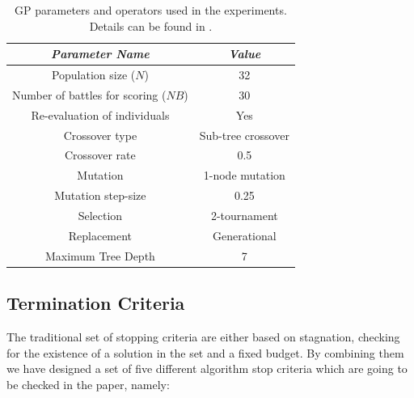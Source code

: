 \documentclass[runningheads,a4paper]{llncs}
\begin{document}
\begin{table}
\begin{center}
\begin{tabular}{|c|c|}
\hline
{\em Parameter Name} & {\em Value} \\ \hline
Population size ($N$) & 32 \\ \hline
Number of battles for scoring ($NB$) & 30 \\ \hline 
Re-evaluation of individuals & Yes \\ \hline
Crossover type & Sub-tree crossover \\ \hline
Crossover rate & 0.5\\ \hline
Mutation  & 1-node mutation\\ \hline
Mutation step-size & 0.25 \\ \hline
Selection & 2-tournament \\ \hline
Replacement & Generational\\ \hline
Maximum Tree Depth &  7 \\ \hline
\end{tabular}
\caption{GP parameters and operators used in the experiments. Details can be found in \cite{EvoStar2014:GPBot}.}
\label{tab:parameters}
\end{center}
\end{table}


\subsection{Termination Criteria}

The traditional set of stopping criteria are either based on stagnation, checking for the existence of a solution in the set and a fixed budget. By combining them we have designed a set of five different algorithm stop criteria which are going to be checked in the paper, namely:
\end{document}
